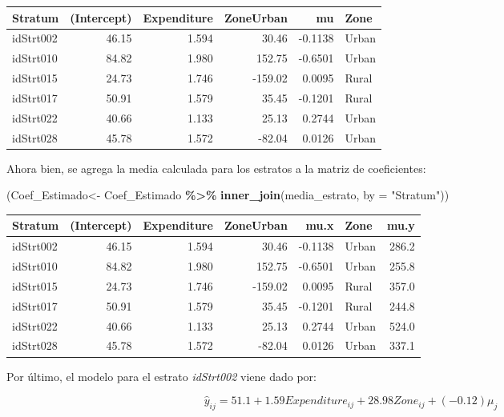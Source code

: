 \documentclass[
  spanish,
  12pt,
]{book}
\newenvironment{Shaded}{\begin{snugshade}}{\end{snugshade}}
\newcommand{\AttributeTok}[1]{\textcolor[rgb]{0.13,0.29,0.53}{#1}}
\newcommand{\FunctionTok}[1]{\textcolor[rgb]{0.13,0.29,0.53}{\textbf{#1}}}
\newcommand{\NormalTok}[1]{#1}
\newcommand{\OtherTok}[1]{\textcolor[rgb]{0.56,0.35,0.01}{#1}}
\newcommand{\SpecialCharTok}[1]{\textcolor[rgb]{0.81,0.36,0.00}{\textbf{#1}}}
\newcommand{\StringTok}[1]{\textcolor[rgb]{0.31,0.60,0.02}{#1}}
\begin{document}
\begin{tabular}{l|r|r|r|r|l}
\hline
Stratum & (Intercept) & Expenditure & ZoneUrban & mu & Zone\\
\hline
idStrt002 & 46.15 & 1.594 & 30.46 & -0.1138 & Urban\\
\hline
idStrt010 & 84.82 & 1.980 & 152.75 & -0.6501 & Urban\\
\hline
idStrt015 & 24.73 & 1.746 & -159.02 & 0.0095 & Rural\\
\hline
idStrt017 & 50.91 & 1.579 & 35.45 & -0.1201 & Rural\\
\hline
idStrt022 & 40.66 & 1.133 & 25.13 & 0.2744 & Urban\\
\hline
idStrt028 & 45.78 & 1.572 & -82.04 & 0.0126 & Urban\\
\hline
\end{tabular}

Ahora bien, se agrega la media calculada para los estratos a la matriz de coeficientes:

\begin{Shaded}
\begin{Highlighting}[]
\NormalTok{(Coef\_Estimado}\OtherTok{\textless{}{-}}\NormalTok{ Coef\_Estimado }\SpecialCharTok{\%\textgreater{}\%}  \FunctionTok{inner\_join}\NormalTok{(media\_estrato, }\AttributeTok{by =} \StringTok{"Stratum"}\NormalTok{))}
\end{Highlighting}
\end{Shaded}

\begin{tabular}{l|r|r|r|r|l|r}
\hline
Stratum & (Intercept) & Expenditure & ZoneUrban & mu.x & Zone & mu.y\\
\hline
idStrt002 & 46.15 & 1.594 & 30.46 & -0.1138 & Urban & 286.2\\
\hline
idStrt010 & 84.82 & 1.980 & 152.75 & -0.6501 & Urban & 255.8\\
\hline
idStrt015 & 24.73 & 1.746 & -159.02 & 0.0095 & Rural & 357.0\\
\hline
idStrt017 & 50.91 & 1.579 & 35.45 & -0.1201 & Rural & 244.8\\
\hline
idStrt022 & 40.66 & 1.133 & 25.13 & 0.2744 & Urban & 524.0\\
\hline
idStrt028 & 45.78 & 1.572 & -82.04 & 0.0126 & Urban & 337.1\\
\hline
\end{tabular}

Por último, el modelo para el estrato \emph{idStrt002} viene dado por:

\[
\hat{y}_{ij}=51.1+1.59Expenditure_{ij}+28.98Zone_{ij}+\left(-0.12\right)\mu_{j}
\]
\end{document}
